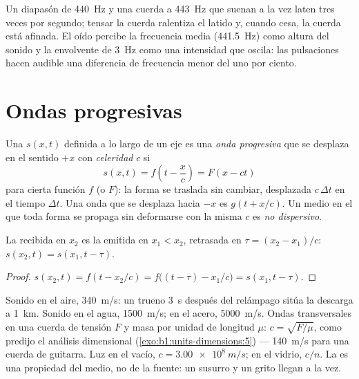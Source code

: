 \begin{example}\label{ex:b1:wave-propagation:tuning}
Un diapasón de \qty{440}{Hz} y una cuerda a \qty{443}{Hz} que suenan a la
vez laten tres veces por segundo; tensar la cuerda ralentiza el latido y,
cuando cesa, la cuerda está afinada. El oído percibe la frecuencia media
(\qty{441.5}{Hz}) como altura del sonido y la envolvente de \qty{3}{Hz}
como una intensidad que oscila: las pulsaciones hacen audible una
diferencia de frecuencia menor del uno por ciento.
\end{example}

\section{Ondas progresivas}

\begin{definition}\label{def:b1:wave-propagation:travelling}
Una  $s(x, t)$ definida a lo largo de un eje es una \emph{onda
progresiva} que se desplaza en el sentido $+x$ con \emph{celeridad} $c$ si
\[
s(x, t) = f\!\left(t - \frac{x}{c}\right) = F(x - ct)
\]
para cierta función $f$ (o $F$): la forma se traslada sin cambiar,
desplazada $c\,\Delta t$ en el tiempo $\Delta t$. Una onda que se desplaza
hacia $-x$ es $g(t + x/c)$. Un medio en el que toda forma se propaga sin
deformarse con la misma $c$ es \emph{no dispersivo}.
\end{definition}

\begin{proposition}[Retraso]\label{prop:b1:wave-propagation:delay}
La  recibida en $x_2$ es la  emitida en $x_1 < x_2$, retrasada
en $\tau = (x_2 - x_1)/c$: $s(x_2, t) = s(x_1, t - \tau)$.
\end{proposition}

\begin{proof}
$s(x_2, t) = f(t - x_2/c) = f\big((t - \tau) - x_1/c\big) = s(x_1, t - \tau)$.
\end{proof}

\begin{example}[Celeridades]\label{ex:b1:wave-propagation:celerities}
Sonido en el aire, \qty{340}{m/s}: un trueno \qty{3}{s} después del
relámpago sitúa la descarga a \qty{1}{km}. Sonido en el agua,
\qty{1500}{m/s}; en el acero, \qty{5000}{m/s}. Ondas transversales en una
cuerda de tensión $F$ y masa por unidad de longitud $\mu$:
$c = \sqrt{F/\mu}$, como predijo el análisis dimensional
(\cref{exo:b1:units-dimensions:5}) --- \qty{140}{m/s} para una cuerda de
guitarra. Luz en el vacío, $c = \qty{3.00e8}{m/s}$; en el vidrio, $c/n$.
La  es una propiedad del medio, no de la fuente: un susurro y un
grito llegan a la vez.
\end{example}

